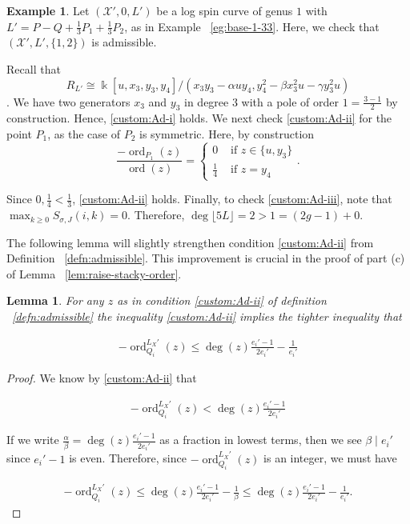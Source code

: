 \documentclass{amsart}
\theoremstyle{plain}
\newtheorem{lem}[thm]{Lemma}
\theoremstyle{definition}
\newtheorem{example}[thm]{Example}
\theoremstyle{remark}
\numberwithin{equation}{section}
\newcommand\Bk{{\Bbbk}}
\DeclareMathOperator{\ord}{ord}
\newcommand\sx{\mathscr X}
\newcommand \subhalf[1]{\frac{{#1} - 1}{2{#1}}}
\newcommand{\halfcan}{L}
\begin{document}
\begin{example}
\label{eg:base-1-33-adm}
Let $(\sx',0 , \halfcan')$ be a log spin curve of genus $1$ with
$\halfcan' = P - Q + \frac{1}{3}P_1 + \frac{1}{3}P_2$, as in Example
~\ref{eg:base-1-33}. Here, we check that $(\sx', \halfcan', \{1,2\})$
is admissible.

Recall that
$$R_{\halfcan'} \cong \Bk[u, x_3, y_3, y_4]/(x_3 y_3- \alpha uy_4, y_4^2 - \beta x_3^2 u - \gamma y_3^2u)$$.
We have two generators $x_3$ and $y_3$ in degree 3 with a pole of order $1=\frac{3- 1}{2}$ by construction. Hence, \ref{custom:Ad-i} holds. We next check \ref{custom:Ad-ii} for the point $P_1$, as the case of $P_2$ is symmetric. Here, by construction
\[
\frac{-\ord_{P_1}(z)}{\ord(z)} = \begin{cases}
	0 &\text{ if }z \in \{u, y_3\}\\
	\frac{1}{4} &\text{ if }z = y_4
\end{cases}.
\]

\noindent
Since $0, \frac{1}{4} < \frac{1}{3}$, \ref{custom:Ad-ii} holds.
Finally, to check \ref{custom:Ad-iii}, note that $\max_{k \geq 0}S_{\sigma,J}(i,k) = 0.$ Therefore, $\deg \lfloor 5L \rfloor  = 2 > 1 = (2 g - 1) + 0$.
\end{example}

The following lemma will slightly strengthen condition
\ref{custom:Ad-ii} from Definition ~\ref{defn:admissible}.
This improvement is crucial in the proof of part (c) of Lemma
~\ref{lem:raise-stacky-order}.

\begin{lem}
\label{lem:admissible_inequality}
For any $z$ as in condition \ref{custom:Ad-ii} of definition ~\ref{defn:admissible} the inequality \ref{custom:Ad-ii} implies the
tighter inequality that

\begin{align*}
	-\ord_{Q_i}
^{\halfcan_X'}(z) \leq \deg(z) \subhalf{e_i'} -\frac{1}{e_i'}
\end{align*}
\end{lem}

\begin{proof}
We know by \ref{custom:Ad-ii} that

\begin{align*}
	-\ord_{Q_i}
^{\halfcan_X'}(z) < \deg(z) \subhalf{e_i'}
\end{align*}

\noindent
If we write $\frac{\alpha}{\beta} = \deg(z) \frac{e_i'- 1}{2e_i'}$ 
as a fraction in lowest terms, then we see $\beta \mid e_i'$ since $
e_i'- 1$ is even. Therefore, since $-\ord_{Q_i}
^{\halfcan_X'}(z)$ is an integer, 
we must have

\begin{align*}
	-\ord_{Q_i}
^{\halfcan_X'}(z) \leq \deg(z) \subhalf{e_i'} - \frac{1}{\beta} \leq 
	\deg(z) \subhalf{e_i'} - \frac{1}{e_i'}.
\end{align*}
\end{proof}
\end{document}
